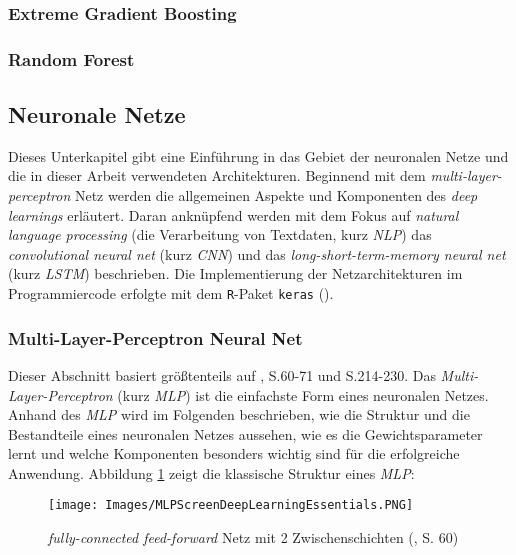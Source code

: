 \documentclass[a4paper,11pt]{article}
\begin{document}
\subsubsection{Extreme Gradient Boosting}\label{kap:XG}
\subsubsection{Random Forest}\label{kap:RF}

\subsection{Neuronale Netze} \label{kap:neuralNets}

Dieses Unterkapitel gibt eine Einführung in das Gebiet der neuronalen Netze und die in dieser Arbeit verwendeten Architekturen. Beginnend mit dem \textit{multi-layer-perceptron} Netz werden die allgemeinen Aspekte und Komponenten des \textit{deep learnings} erläutert. Daran anknüpfend werden mit dem Fokus auf \textit{natural language processing} (die Verarbeitung von Textdaten, kurz \textit{NLP}) das \textit{convolutional neural net} (kurz \textit{CNN}) und das \textit{long-short-term-memory neural net} (kurz \textit{LSTM}) beschrieben. Die Implementierung der Netzarchitekturen im Programmiercode erfolgte mit dem \texttt{R}-Paket \texttt{keras} (\cite{kerasR}).


\subsubsection{Multi-Layer-Perceptron Neural Net}

Dieser Abschnitt basiert größtenteils auf \cite{deepEssentials}, S.60-71 und S.214-230.
Das \textit{Multi-Layer-Perceptron} (kurz \textit{MLP}) ist die einfachste Form eines neuronalen Netzes. Anhand des \textit{MLP} wird im Folgenden beschrieben, wie die Struktur und die Bestandteile eines neuronalen Netzes aussehen, wie es die Gewichtsparameter lernt und welche Komponenten besonders wichtig sind für die erfolgreiche Anwendung. Abbildung \ref{abb:MLPScreen} zeigt die klassische Struktur eines \textit{MLP}:


\begin{figure}[!ht]
\begin{center}
\texttt{[image: Images/MLPScreenDeepLearningEssentials.PNG]}
\caption{\textit{fully-connected feed-forward} Netz mit 2 Zwischenschichten (\cite{deepEssentials}, S. 60)}
\label{abb:MLPScreen}
\end{center}
\end{figure}
\end{document}
